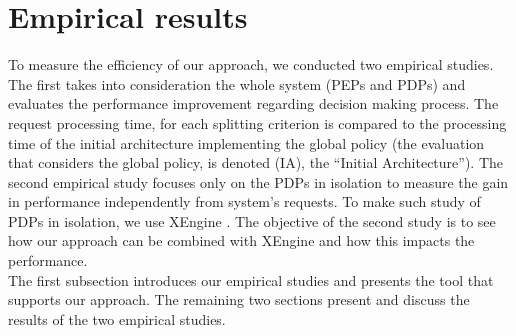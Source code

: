 
\section{Empirical results} \label{sec:experiment}

To measure the efficiency of our approach, we conducted two empirical studies. The first takes into consideration the whole system 
(PEPs and PDPs) and evaluates the performance improvement regarding decision making process. The request processing time, 
for each splitting criterion is compared to the processing time of the initial architecture implementing the global policy (the evaluation 
that considers the global policy, is denoted (IA), the ``Initial Architecture''). The second empirical study focuses only on the PDPs in isolation to measure the gain in performance independently from system's requests. To make 
such study of PDPs in isolation, we use XEngine \cite{Xengine}. The objective of the second study is to see how our approach can be combined with XEngine and 
how this impacts the performance.
\\
The first subsection introduces our empirical studies and presents the tool that supports our approach. The remaining two sections present and discuss the results of the two empirical studies.  

